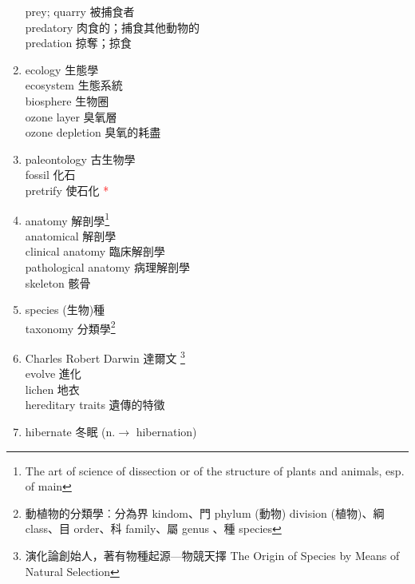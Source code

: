 \documentclass[twoside,b5paper]{book}
\begin{document}
\begin{enumerate}
      prey; quarry  被捕食者\\
      predatory 肉食的；捕食其他動物的\\
      predation  掠奪；掠食
    \item
      ecology 生態學\\
      ecosystem  生態系統\\
      biosphere  生物圈\\
      ozone  layer 臭氧層\\
      ozone depletion 臭氧的耗盡
    \item
      paleontology  古生物學\\
      fossil  化石\\
      pretrify 使石化 \textcolor{red}{*}
    \item
      anatomy  解剖學\footnote{The art of science of dissection or of the structure of plants and animals, esp. of main}\\
      anatomical 解剖學\\
      clinical anatomy 臨床解剖學\\
      pathological  anatomy 病理解剖學\\
      skeleton  骸骨
    \item
      species  (生物)種\\
      taxonomy  分類學\footnote{動植物的分類學︰分為界 kindom、門 phylum  (動物) division (植物)、綱 class、目 order、科 family、屬 genus 、種 species }
    \item
      Charles Robert Darwin 達爾文 \footnote{演化論創始人，著有物種起源---物競天擇 The Origin of Species by Means of Natural Selection}\\
      evolve  進化 \\
      lichen  地衣\\
      hereditary  traits 遺傳的特徵
    \item
      hibernate 冬眠 (n.$\to$ hibernation)

\end{enumerate}
\end{document}
